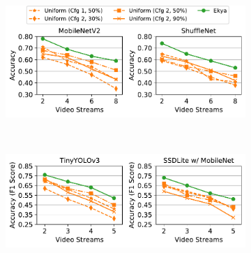 \begin{figure}[t]
\captionsetup[subfigure]{justification=centering}
  \centering
  \begin{subfigure}[t]{0.9\linewidth}
    \centering
    \includegraphics[width=\linewidth]{ekya/results/generality/e2e_1gpu_cityscapes_objclass.pdf}
    \caption{\small {}}
    \label{fig:sys-impl-generality-objclass}
  \end{subfigure}
  \\
  \begin{subfigure}[t]{0.9\linewidth}
    \centering
    \includegraphics[width=\linewidth]{ekya/results/generality/e2e_1gpu_cityscapes_objdet.pdf}
    \caption{\small {}}
    \label{fig:sys-impl-generality-objdet}
  \end{subfigure}
  ~~~
  \caption{\small \bf  {}}
  \label{fig:generality-models}
\end{figure}

